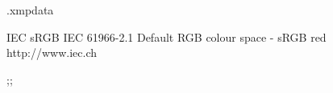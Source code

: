 \RequirePackage{filecontents}
\begin{filecontents*}{\jobname.xmpdata}
	 \maketitle
{}
\Keywords{}
{IEC sRGB}
{IEC 61966-2.1 Default RGB colour space - sRGB} red
{http://www.iec.ch}
\end{filecontents*};;


\newcommand\EncryptoPrintTitle{Securely Realizing Output Privacy in MPC} %
\newcommand\EncryptoSupervisor{M.Sc. Helen Möllering \\ M.Sc. Oleksandr Tkachenko}

\newcommand\EncryptoAuthor{Liang Zhao}

\documentclass[paper = a4,
		headings = normal,
		headsepline,
		parskip = half,
		listof = totoc,
		bibliography = totoc,
		numbers = noendperiod,
		titlepage = firstiscover,
		captions = tableheading, %
		toc = indentunnumbered
	]
	{scrreprt}



\usepackage[]{encryptothesis}
\usepackage{upgreek}
\usepackage{placeins}


\usepackage{amsmath}
\usepackage{bm}



\usepackage{booktabs} %
\usepackage{siunitx} %
\usepackage{pgfplotstable} %

\usepackage{pdflscape}
\usepackage{float}
\graphicspath{ {./img/} }

\newtheorem{theorem}{Theorem}
\newtheorem{prop}{Proposition}


